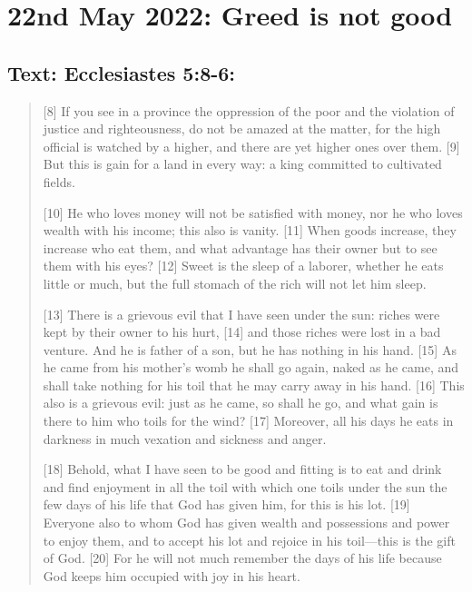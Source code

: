 \section{22nd May 2022: Greed is not good}
\subsection*{Text: Ecclesiastes 5:8-6:}
  \begin{quote}
    [8] If you see in a province the oppression of the poor and the violation
    of justice and righteousness, do not be amazed at the matter, for the
    high official is watched by a higher, and there are yet higher ones over
    them.  [9] But this is gain for a land in every way: a king committed to
    cultivated fields.

    [10] He who loves money will not be satisfied with money, nor he who
    loves wealth with his income; this also is vanity.  [11] When goods
    increase, they increase who eat them, and what advantage has their owner
    but to see them with his eyes?  [12] Sweet is the sleep of a laborer,
    whether he eats little or much, but the full stomach of the rich will not
    let him sleep.

    [13] There is a grievous evil that I have seen under the sun: riches were
    kept by their owner to his hurt, [14] and those riches were lost in a bad
    venture.  And he is father of a son, but he has nothing in his hand.
    [15] As he came from his mother’s womb he shall go again, naked as he
    came, and shall take nothing for his toil that he may carry away in his
    hand.  [16] This also is a grievous evil: just as he came, so shall he
    go, and what gain is there to him who toils for the wind?  [17] Moreover,
    all his days he eats in darkness in much vexation and sickness and anger.

    [18] Behold, what I have seen to be good and fitting is to eat and drink
    and find enjoyment in all the toil with which one toils under the sun the
    few days of his life that God has given him, for this is his lot.  [19]
    Everyone also to whom God has given wealth and possessions and power to
    enjoy them, and to accept his lot and rejoice in his toil—this is the
    gift of God.  [20] For he will not much remember the days of his life
    because God keeps him occupied with joy in his heart.


\end{quote}
